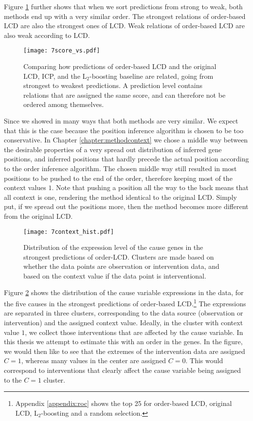 Figure \ref{fig:7:scorevs} further shows that when we sort predictions from strong to weak, both methods end up with a very similar order. The strongest relations of order-based LCD are also the strongest ones of LCD. Weak relations of order-based LCD are also weak according to LCD. 

\begin{figure}[h]
    \centering
    \texttt{[image: 7score\_vs.pdf]}
    \caption{Comparing how predictions of order-based LCD and the original LCD, ICP, and the L$_2$-boosting baseline are related, going from strongest to weakest predictions. A prediction level contains relations that are assigned the same score, and can therefore not be ordered among themselves.}
    \label{fig:7:scorevs}
\end{figure}

Since we showed in many ways that both methods are very similar. We expect that this is the case because the position inference algorithm is chosen to be too conservative. In Chapter \ref{chapter:methodcontext} we chose a middle way between the desirable properties of a very spread out distribution of inferred gene positions, and inferred positions that hardly precede the actual position according to the order inference algorithm. The chosen middle way still resulted in most positions to be pushed to the end of the order, therefore keeping most of the context values $1$. Note that pushing a position all the way to the back means that all context is one, rendering the method identical to the original LCD. Simply put, if we spread out the positions more, then the method becomes more different from the original LCD. 

\begin{figure}[h]
    \centering
    \texttt{[image: 7context\_hist.pdf]}
    \caption{Distribution of the expression level of the cause genes in the strongest predictions of order-LCD. Clusters are made based on whether the data points are observation or intervention data, and based on the context value if the data point is interventional.}
    \label{fig:7:contexthist}
\end{figure}

Figure \ref{fig:7:contexthist} shows the distribution of the cause variable expressions in the data, for the five causes in the strongest predictions of order-based LCD.\footnote{Appendix \ref{appendix:roc} shows the top 25 for order-based LCD, original LCD, L$_2$-boosting and a random selection.} The expressions are separated in three clusters, corresponding to the data source (observation or intervention) and the assigned context value. Ideally, in the cluster with context value $1$, we collect those interventions that are affected by the cause variable. In this thesis we attempt to estimate this with an order in the genes. In the figure, we would then like to see that the extremes of the intervention data are assigned $C=1$, whereas many values in the center are assigned $C=0$. This would correspond to interventions that clearly affect the cause variable being assigned to the $C=1$ cluster. 

